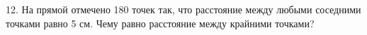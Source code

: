 12. На прямой отмечено 180 точек так, что расстояние между любыми соседними точками равно 5 см. Чему равно расстояние между крайними точками?\\
